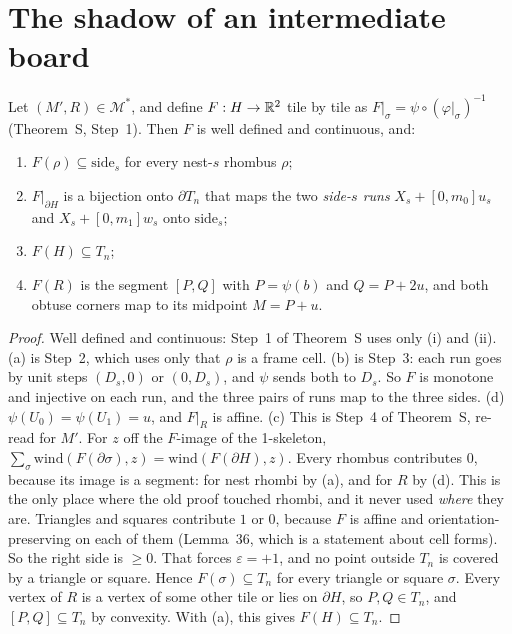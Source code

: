 \documentclass[11pt]{article}
\theoremstyle{definition}\newtheorem{definition}[theorem]{Definition}\newtheorem{remark}[theorem]{Remark}
\newcommand{\M}{\mathcal M}
\begin{document}
\section{The shadow of an intermediate board}\label{sec:sh}
\begin{lemma}[shadow]\label{lem:sh}
Let $(M',R)\in\M^*$, and define $F:H\to\mathbb R^2$ tile by tile as $F|_\sigma=\psi\circ(\varphi|_\sigma)^{-1}$ (Theorem~S, Step~1). Then $F$ is well defined and continuous, and:
\begin{enumerate}
\item[(a)] $F(\rho)\subseteq\mathrm{side}_s$ for every nest-$s$ rhombus $\rho$;
\item[(b)] $F|_{\partial H}$ is a bijection onto $\partial T_n$ that maps the two \emph{side-$s$ runs} $X_s+[0,m_0]u_s$ and $X_s+[0,m_1]w_s$ onto $\mathrm{side}_s$;
\item[(c)] $F(H)\subseteq T_n$;
\item[(d)] $F(R)$ is the segment $[P,Q]$ with $P=\psi(b)$ and $Q=P+2u$, and both obtuse corners map to its midpoint $M=P+u$.
\end{enumerate}
\end{lemma}
\begin{proof}
Well defined and continuous: Step~1 of Theorem~S uses only (i) and (ii). (a) is Step~2, which uses only that $\rho$ is a frame cell. (b) is Step~3: each run goes by unit steps $(D_s,0)$ or $(0,D_s)$, and $\psi$ sends both to $D_s$. So $F$ is monotone and injective on each run, and the three pairs of runs map to the three sides. (d) $\psi(U_0)=\psi(U_1)=u$, and $F|_R$ is affine.
(c) This is Step~4 of Theorem~S, re-read for $M'$. For $z$ off the $F$-image of the 1-skeleton, $\sum_\sigma\mathrm{wind}(F(\partial\sigma),z)=\mathrm{wind}(F(\partial H),z)$. Every rhombus contributes $0$, because its image is a segment: for nest rhombi by (a), and for $R$ by (d). This is the only place where the old proof touched rhombi, and it never used \emph{where} they are. Triangles and squares contribute $1$ or $0$, because $F$ is affine and orientation-preserving on each of them (Lemma~36, which is a statement about cell forms). So the right side is $\ge0$. That forces $\varepsilon=+1$, and no point outside $T_n$ is covered by a triangle or square. Hence $F(\sigma)\subseteq T_n$ for every triangle or square $\sigma$. Every vertex of $R$ is a vertex of some other tile or lies on $\partial H$, so $P,Q\in T_n$, and $[P,Q]\subseteq T_n$ by convexity. With (a), this gives $F(H)\subseteq T_n$.
\end{proof}
\end{document}
